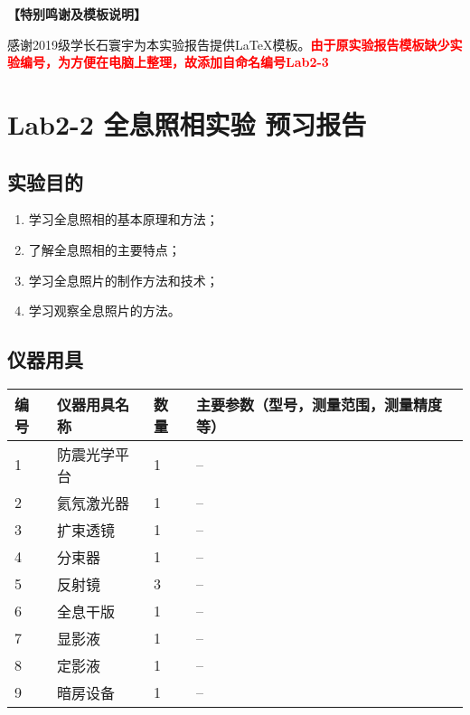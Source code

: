 \documentclass[dvipsnames, svgnames,a4paper,11pt]{article}
\begin{document}
	
	\textbf{【特别鸣谢及模板说明】}	
	
	感谢2019级学长石寰宇为本实验报告提供\LaTeX 模板。\textcolor{red}{\textbf{由于原实验报告模板缺少实验编号，为方便在电脑上整理，故添加自命名编号Lab2-3}}
	
	
	
	\clearpage
	\tableofcontents
	\clearpage
	
	
	
	
	\setcounter{section}{0}
	\section{Lab2-2 全息照相实验 \quad\heiti 预习报告}
	
	\subsection{实验目的}
	\begin{enumerate}
		\item 学习全息照相的基本原理和方法；
		\item 了解全息照相的主要特点；
		\item 学习全息照片的制作方法和技术；
		\item 学习观察全息照片的方法。
	\end{enumerate}
	
	\subsection{仪器用具}
	\begin{table}[htbp]
		\centering
		\renewcommand\arraystretch{1.6}
		\begin{tabular}{p{}|p{}|p{}|p{}}
			\hline
			编号& 仪器用具名称 & 数量 &  主要参数（型号，测量范围，测量精度等） \\
			\hline
			1  & 防震光学平台 & 1  & --  \\
			2  & 氦氖激光器  & 1  & --  \\
			3  & 扩束透镜   & 1  & --  \\
			4  & 分束器    & 1  & --  \\
			5  & 反射镜    & 3  & --  \\
			6  & 全息干版   & 1  & --  \\
			7  & 显影液    & 1  & --  \\
			8  & 定影液    & 1  & --  \\
			9  & 暗房设备   & 1  & --  \\
			\hline
		\end{tabular}
	\end{table}
	
\end{document}
